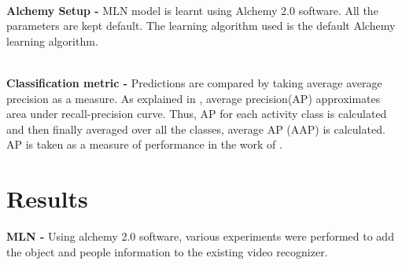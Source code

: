 ~ \\
{\bf Alchemy Setup - } MLN model is learnt using Alchemy 2.0 \cite{alchemy2.0} software.
All the parameters are kept default. The learning algorithm used is the default Alchemy
learning algorithm.

~\\
{\bf Classification metric - } Predictions are compared by taking  average average precision as a measure.
As explained in \cite{actionsInContext}, average precision(AP) approximates area under recall-precision curve.
Thus, AP for each activity class is calculated and then finally averaged over all the classes, average AP (AAP) is calculated.
AP is taken as a measure of performance in the work of \cite{actionsInContext}.

\section{Results}
{\bf MLN - } Using alchemy 2.0 \cite{alchemy2.0} software, various experiments were performed 
to add the object and people information to the existing video recognizer. 
